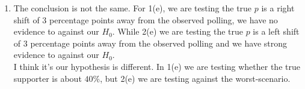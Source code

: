 \documentclass[12pt, oneside, a4paper]{article}
\begin{document}
\begin{enumerate}
\begin{enumerate}[label = (\alph*)]
			\item The conclusion is not the same. For 1(e), we are testing the true $p$ is a right shift of $3$ percentage points away from the observed polling, we have no evidence to against our $H_0$. While 2(e) we are testing the true $p$ is a left shift of $3$ percentage points away from the observed polling and we have strong evidence to against our $H_0$. \\
			I think it's our hypothesis is different. In 1(e) we are testing whether the true supporter is about $40\%$, but 2(e) we are testing against the worst-scenario.
		\end{enumerate}
	\end{enumerate}
\end{document}
